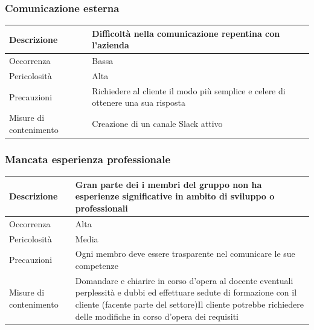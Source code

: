 \documentclass{article}
\begin{document}
\subsubsection{Comunicazione esterna}
\begin{center}
\begin{tabular}{|P{10em}| P{20em}|}
\hline
     Descrizione & Difficoltà nella comunicazione repentina con l'azienda\\ 
     \hline
    Occorrenza & Bassa\\
    \hline
    Pericolosità & Alta \\
    \hline
    Precauzioni & Richiedere al cliente il modo più semplice e celere di ottenere una sua risposta \\
    \hline
    Misure di contenimento & Creazione di un canale Slack attivo\\
    \hline
\end{tabular}
\label{tab:comesterna}
\end{center}

\subsubsection{Mancata esperienza professionale}
\begin{center}
\begin{tabular}{|P{10em} |P{20em}|} 
\hline
     Descrizione & Gran parte dei i membri del gruppo non ha esperienze significative in ambito di sviluppo o professionali\\ 
     \hline
    Occorrenza & Alta\\
    \hline
    Pericolosità & Media \\
    \hline
    Precauzioni & Ogni membro deve essere trasparente nel comunicare le sue competenze \\
    \hline
    Misure di contenimento & Domandare e chiarire in corso d'opera al docente eventuali perplessità e dubbi ed effettuare sedute di formazione con il cliente (facente parte del settore)Il cliente potrebbe richiedere delle modifiche in corso d'opera dei requisiti \\
 \hline
\end{tabular}
\label{tab:espprof}
\end{center}
\end{document}
